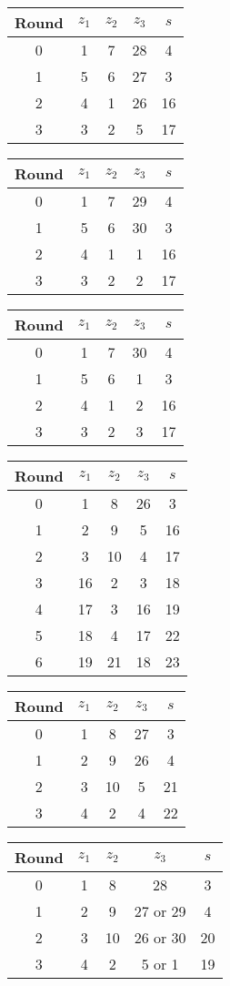 \begin{multicols}{2}
\begin{tabular}{c | c | c | c | c }
Round & $z_1$ & $z_2$ & $z_3$ & $s$ \\
\hline
0 & 1 & 7 & 28 & 4 \\
1 & 5 & 6 & 27 & 3 \\
2 & 4 & 1 & 26 & 16 \\
3 & 3 & 2 & 5 & 17
\end{tabular}


\begin{tabular}{c | c | c | c | c }
Round & $z_1$ & $z_2$ & $z_3$ & $s$ \\
\hline
0 & 1 & 7 & 29 & 4 \\
1 & 5 & 6 & 30 & 3 \\
2 & 4 & 1 & 1 & 16 \\
3 & 3 & 2 & 2 & 17
\end{tabular}


\begin{tabular}{c | c | c | c | c }
Round & $z_1$ & $z_2$ & $z_3$ & $s$ \\
\hline
0 & 1 & 7 & 30 & 4 \\
1 & 5 & 6 & 1 & 3 \\
2 & 4 & 1 & 2 & 16 \\
3 & 3 & 2 & 3 & 17
\end{tabular}


\begin{tabular}{c | c | c | c | c }
Round & $z_1$ & $z_2$ & $z_3$ & $s$ \\
\hline
0 & 1 & 8 & 26 & 3  \\
1 & 2 & 9 & 5 & 16 \\
2 & 3 & 10 & 4 & 17 \\
3 & 16 & 2 & 3 & 18 \\
4 & 17 & 3 & 16 & 19 \\
5 & 18 & 4 & 17 & 22 \\
6 & 19 & 21 & 18 & 23
\end{tabular}


\begin{tabular}{c | c | c | c | c }
Round & $z_1$ & $z_2$ & $z_3$ & $s$ \\
\hline
0 & 1 & 8 & 27 & 3 \\
1 & 2 & 9 & 26 & 4 \\
2 & 3 & 10 & 5 & 21 \\
3 & 4 & 2 & 4 & 22
\end{tabular}


\begin{tabular}{c | c | c | c | c }
Round & $z_1$ & $z_2$ & $z_3$ & $s$ \\
\hline
0 & 1 & 8 & 28 & 3 \\
1 & 2 & 9 & 27 or 29 & 4 \\
2 & 3 & 10 & 26 or 30 & 20 \\
3 & 4 & 2 & 5 or 1 & 19
\end{tabular}



\end{multicols}
